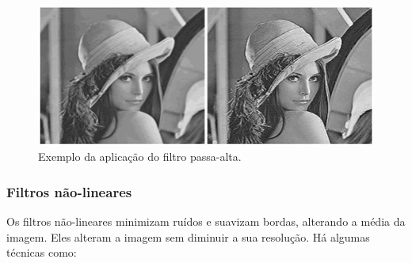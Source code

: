 \documentclass{article}
\begin{document}
\begin{figure}[!ht]
  \centering
  \includegraphics[scale=0.8]{Figure/figura2.jpg}
  \caption{Exemplo da aplicação do filtro passa-alta.}
  \label{fig:figure2}
\end{figure}

\subsubsection{Filtros não-lineares}
Os filtros não-lineares minimizam ruídos e suavizam bordas, alterando a média da imagem.
Eles alteram a imagem sem diminuir a sua resolução.
Há algumas técnicas como: 
\end{document}
